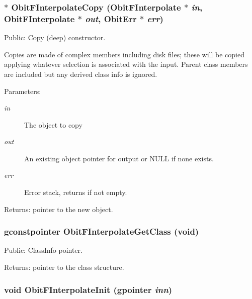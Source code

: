 \subsubsection{$\ast$ Obit\-FInterpolate\-Copy ({\bf Obit\-FInterpolate} $\ast$ {\em in}, {\bf Obit\-FInterpolate} $\ast$ {\em out}, {\bf Obit\-Err} $\ast$ {\em err})}\label{ObitFInterpolate_8c_a10}


Public: Copy (deep) constructor. 

Copies are made of complex members including disk files; these will be copied applying whatever selection is associated with the input. Parent class members are included but any derived class info is ignored. \begin{Desc}
\item[Parameters:]
\begin{description}
\item[{\em in}]The object to copy \item[{\em out}]An existing object pointer for output or NULL if none exists. \item[{\em err}]Error stack, returns if not empty. \end{description}
\end{Desc}
\begin{Desc}
\item[Returns:]pointer to the new object. \end{Desc}
\subsubsection{\setlength{\rightskip}{0pt plus 5cm}gconstpointer Obit\-FInterpolate\-Get\-Class (void)}\label{ObitFInterpolate_8c_a9}


Public: Class\-Info pointer. 

\begin{Desc}
\item[Returns:]pointer to the class structure. \end{Desc}
\subsubsection{\setlength{\rightskip}{0pt plus 5cm}void Obit\-FInterpolate\-Init (gpointer {\em inn})}\label{ObitFInterpolate_8c_a3}



